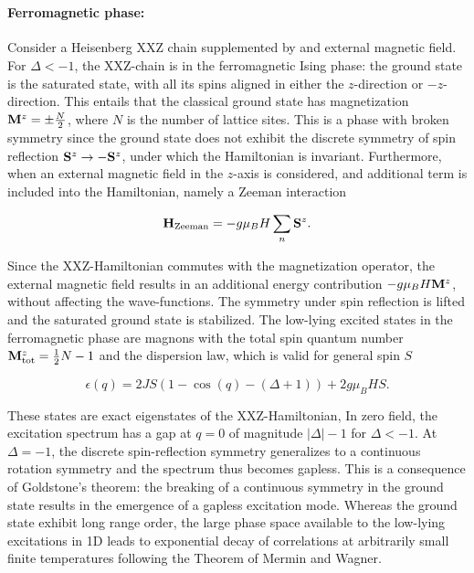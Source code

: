 \documentclass{homework}
\begin{document}
\blanky \\

\paragraph{\textbf{Ferromagnetic phase: }}

Consider a Heisenberg XXZ chain supplemented by and external magnetic field. For $\Delta < -1$, the XXZ-chain is in the ferromagnetic Ising phase: the ground state is the saturated state, with all its spins aligned in either the $z$-direction or $-z$-direction. This entails that the classical ground state has magnetization ${\bf M}^z = \pm \frac{N}{2}$, where $N$ is the number of lattice sites. This is a phase with broken symmetry since the ground state does not exhibit the discrete symmetry of spin reflection ${\bf S}^z \rightarrow -{\bf S}^z$, under which the Hamiltonian is invariant. Furthermore, when an external magnetic field in the $z$-axis is considered, and additional term is included into the Hamiltonian, namely a Zeeman interaction 

$$
    {\bf H}_{\textnormal{Zeeman}} = - g \mu_B H \sum_{n} {\bf S}^z.
$$

Since the XXZ-Hamiltonian commutes with the magnetization operator, the external magnetic field results in an additional energy contribution $-g \mu_B H {\bf M}^z$, without affecting the wave-functions. The symmetry under spin reflection is lifted and the saturated ground state is stabilized. The low-lying excited states in the ferromagnetic phase are magnons with the total spin quantum number ${\bf M}^z_{\textnormal{tot}} = \frac{1}{2} N - 1$ and the dispersion law, which is valid for general spin $S$

\begin{equation}
    \epsilon(q) = 2 J S (1-\cos(q) - (\Delta + 1)) + 2g \mu_B H S. 
    \label{XXZ-spectrum}
\end{equation}

These states are exact eigenstates of the XXZ-Hamiltonian, In zero field, the excitation spectrum has a gap at $q=0$ of magnitude $|\Delta| - 1$ for $\Delta < -1$. At $\Delta = -1$, the discrete spin-reflection symmetry generalizes to a continuous rotation symmetry and the spectrum thus becomes gapless. This is a consequence of Goldstone's theorem: the breaking of a continuous symmetry in the ground state results in the emergence of a gapless excitation mode. Whereas the ground state exhibit long range order, the large phase space available to the low-lying excitations in 1D leads to exponential decay of correlations at arbitrarily small finite temperatures following the Theorem of Mermin and Wagner. \\
\end{document}

